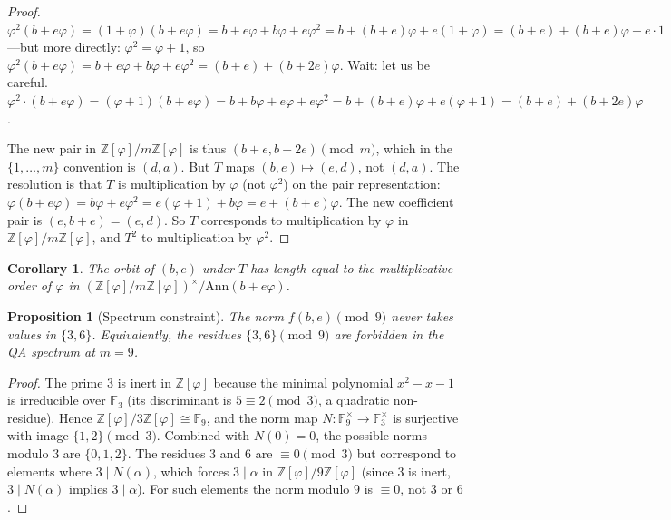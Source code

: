 \documentclass[11pt]{article}
\newtheorem{proposition}[definition]{Proposition}
\newtheorem{corollary}[definition]{Corollary}
\newcommand{\Zphi}{\mathbb{Z}[\varphi]}
\begin{document}
\begin{proof}
$\varphi^2(b+e\varphi) = (1+\varphi)(b+e\varphi) = b + e\varphi + b\varphi + e\varphi^2 = b + (b+e)\varphi + e(1+\varphi) = (b+e) + (b+e)\varphi + e\cdot 1$---but more directly: $\varphi^2 = \varphi+1$, so $\varphi^2(b+e\varphi) = b+e\varphi + b\varphi + e\varphi^2 = (b+e) + (b+2e)\varphi$.  Wait: let us be careful.  $\varphi^2 \cdot (b + e\varphi) = (\varphi+1)(b+e\varphi) = b + b\varphi + e\varphi + e\varphi^2 = b + (b+e)\varphi + e(\varphi+1) = (b+e) + (b+2e)\varphi$.

The new pair in $\Zphi/m\Zphi$ is thus $(b+e, b+2e) \pmod{m}$, which in the $\{1,\dots,m\}$ convention is $(d,a)$.  But $T$ maps $(b,e) \mapsto (e,d)$, not $(d,a)$.  The resolution is that $T$ is multiplication by $\varphi$ (not $\varphi^2$) on the pair representation: $\varphi(b+e\varphi) = b\varphi + e\varphi^2 = e(\varphi+1) + b\varphi = e + (b+e)\varphi$.  The new coefficient pair is $(e, b+e) = (e, d)$.  So $T$ corresponds to multiplication by $\varphi$ in $\Zphi/m\Zphi$, and $T^2$ to multiplication by $\varphi^2$.
\end{proof}

\begin{corollary}
The orbit of $(b,e)$ under $T$ has length equal to the multiplicative order of $\varphi$ in $(\Zphi/m\Zphi)^\times / \mathrm{Ann}(b+e\varphi)$.
\end{corollary}

\begin{proposition}[Spectrum constraint]\label{prop:spectrum}
The norm $f(b,e) \pmod{9}$ never takes values in $\{3, 6\}$.  Equivalently, the residues $\{3,6\} \pmod{9}$ are forbidden in the QA spectrum at $m=9$.
\end{proposition}

\begin{proof}
The prime $3$ is inert in $\Zphi$ because the minimal polynomial $x^2 - x - 1$ is irreducible over $\mathbb{F}_3$ (its discriminant is $5 \equiv 2 \pmod{3}$, a quadratic non-residue).  Hence $\Zphi / 3\Zphi \cong \mathbb{F}_9$, and the norm map $N \colon \mathbb{F}_9^\times \to \mathbb{F}_3^\times$ is surjective with image $\{1, 2\} \pmod{3}$.  Combined with $N(0)=0$, the possible norms modulo $3$ are $\{0,1,2\}$.  The residues $3$ and $6$ are $\equiv 0 \pmod{3}$ but correspond to elements where $3 \mid N(\alpha)$, which forces $3 \mid \alpha$ in $\Zphi/9\Zphi$ (since $3$ is inert, $3 \mid N(\alpha)$ implies $3 \mid \alpha$).  For such elements the norm modulo $9$ is $\equiv 0$, not $3$ or $6$.
\end{proof}
\end{document}
